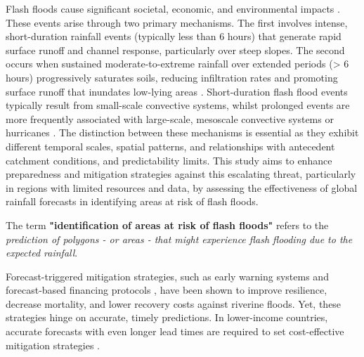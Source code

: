 Flash floods cause significant societal, economic, and environmental impacts \citep{Dordevic_2020}. These events arise through two primary mechanisms. The first involves intense, short-duration rainfall events (typically less than 6 hours) that generate rapid surface runoff and channel response, particularly over steep slopes. The second occurs when sustained moderate-to-extreme rainfall over extended periods (> 6 hours) progressively saturates soils, reducing infiltration rates and promoting surface runoff that inundates low-lying areas \citep{Speight_2021}. Short-duration flash flood events typically result from small-scale convective systems, whilst prolonged events are more frequently associated with large-scale, mesoscale convective systems or hurricanes \citep{Doswell_2001}. The distinction between these mechanisms is essential as they exhibit different temporal scales, spatial patterns, and relationships with antecedent catchment conditions, and predictability limits. This study aims to enhance preparedness and mitigation strategies against this escalating threat, particularly in regions with limited resources and data, by assessing the effectiveness of global rainfall forecasts in identifying areas at risk of flash floods.

\begin{tcolorbox}[
  colframe=colour_chapter5, %
  colback=white,            %
  sharp corners,            %
  boxrule=2mm,              %
  left=0mm,                 %
  right=0mm,                %
  toprule=0mm,              %
  bottomrule=0mm,           %
  rightrule=2mm            %
]
{\color{colour_chapter5} {\setlength{\parindent}{1.0em} The term \textbf{"identification of areas at risk of flash floods"} refers to the \textit{prediction of polygons - or areas - that might experience flash flooding due to the expected rainfall}.}}
\end{tcolorbox}

Forecast-triggered mitigation strategies, such as early warning systems \citep{CoughlanDePerez_2022, ŠakićTrogrlić_2022} and forecast-based financing protocols \citep{Bischiniotis_2019a, Perez_2016}, have been shown to improve resilience, decrease mortality, and lower recovery costs against riverine floods. Yet, these strategies hinge on accurate, timely predictions. In lower-income countries, accurate forecasts with even longer lead times are required to set cost-effective mitigation strategies \citep{Bazo_2019, Kiptum_2023}. 

